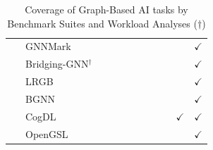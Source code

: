 \begin{landscape}
\begin{table}[htbp]
\begin{tabular}{ll|ccccccccc}
               {\footnotesize ~              }  & {\footnotesize GNNMark~\cite{Baruah2021}               }      &               &               &               &               &               &               &                &               & $\checkmark$  \\
               {\footnotesize ~              }  & {\footnotesize Bridging-GNN$^{\dagger}$~\cite{Huang2021}  }   &               &               &               &               &               &               &                &               & $\checkmark$  \\
               {\footnotesize ~              }  & {\footnotesize LRGB~\cite{Dwivedi2022}                 }      &               &               &               &               &               &               &                &               & $\checkmark$  \\
               {\footnotesize ~              }  & {\footnotesize BGNN~\cite{Dwivedi2023}                 }      &               &               &               &               &               &               &                &               & $\checkmark$  \\
               {\footnotesize ~              }  & {\footnotesize CogDL~\cite{Cen2023}                    }      &               &               &               &               &               &               &                & $\checkmark$  & $\checkmark$  \\
               {\footnotesize ~              }  & {\footnotesize OpenGSL~\cite{Zhou2024}               }        &               &               &               &               &               &               &                &               & $\checkmark$  \\
        \end{tabular}
        \caption{Coverage of Graph-Based AI tasks by Benchmark Suites and Workload Analyses ($\dagger$)}
        \label{table:benchmark-kernels}
    \end{table}
\end{landscape}